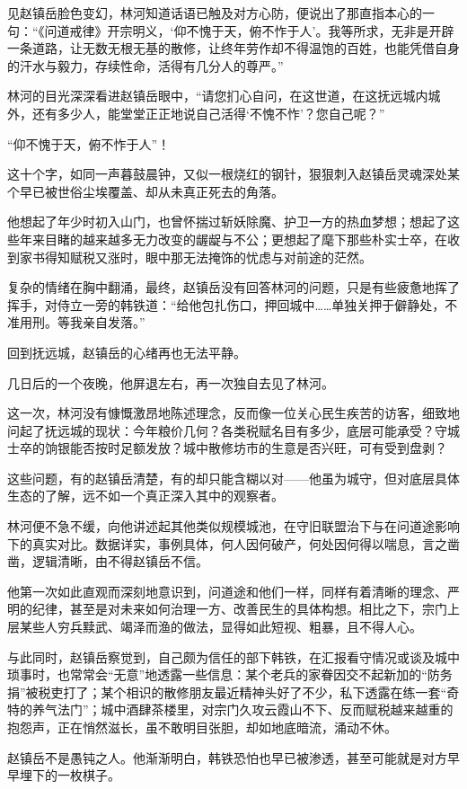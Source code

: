 见赵镇岳脸色变幻，林河知道话语已触及对方心防，便说出了那直指本心的一句：“《问道戒律》开宗明义，‘仰不愧于天，俯不怍于人’。我等所求，无非是开辟一条道路，让无数无根无基的散修，让终年劳作却不得温饱的百姓，也能凭借自身的汗水与毅力，存续性命，活得有几分人的尊严。”

林河的目光深深看进赵镇岳眼中，“请您扪心自问，在这世道，在这抚远城内城外，还有多少人，能堂堂正正地说自己活得‘不愧不怍’？您自己呢？”

“仰不愧于天，俯不怍于人”！

这十个字，如同一声暮鼓晨钟，又似一根烧红的钢针，狠狠刺入赵镇岳灵魂深处某个早已被世俗尘埃覆盖、却从未真正死去的角落。

他想起了年少时初入山门，也曾怀揣过斩妖除魔、护卫一方的热血梦想；想起了这些年来目睹的越来越多无力改变的龌龊与不公；更想起了麾下那些朴实士卒，在收到家书得知赋税又涨时，眼中那无法掩饰的忧虑与对前途的茫然。

复杂的情绪在胸中翻涌，最终，赵镇岳没有回答林河的问题，只是有些疲惫地挥了挥手，对侍立一旁的韩铁道：“给他包扎伤口，押回城中……单独关押于僻静处，不准用刑。等我亲自发落。”

回到抚远城，赵镇岳的心绪再也无法平静。

几日后的一个夜晚，他屏退左右，再一次独自去见了林河。

这一次，林河没有慷慨激昂地陈述理念，反而像一位关心民生疾苦的访客，细致地问起了抚远城的现状：今年粮价几何？各类税赋名目有多少，底层可能承受？守城士卒的饷银能否按时足额发放？城中散修坊市的生意是否兴旺，可有受到盘剥？

这些问题，有的赵镇岳清楚，有的却只能含糊以对——他虽为城守，但对底层具体生态的了解，远不如一个真正深入其中的观察者。

林河便不急不缓，向他讲述起其他类似规模城池，在守旧联盟治下与在问道途影响下的真实对比。数据详实，事例具体，何人因何破产，何处因何得以喘息，言之凿凿，逻辑清晰，由不得赵镇岳不信。

他第一次如此直观而深刻地意识到，问道途和他们一样，同样有着清晰的理念、严明的纪律，甚至是对未来如何治理一方、改善民生的具体构想。相比之下，宗门上层某些人穷兵黩武、竭泽而渔的做法，显得如此短视、粗暴，且不得人心。

与此同时，赵镇岳察觉到，自己颇为信任的部下韩铁，在汇报看守情况或谈及城中琐事时，也常常会“无意”地透露一些信息：某个老兵的家眷因交不起新加的“防务捐”被税吏打了；某个相识的散修朋友最近精神头好了不少，私下透露在练一套“奇特的养气法门”；城中酒肆茶楼里，对宗门久攻云霞山不下、反而赋税越来越重的抱怨声，正在悄然滋长，虽不敢明目张胆，却如地底暗流，涌动不休。

赵镇岳不是愚钝之人。他渐渐明白，韩铁恐怕也早已被渗透，甚至可能就是对方早早埋下的一枚棋子。

